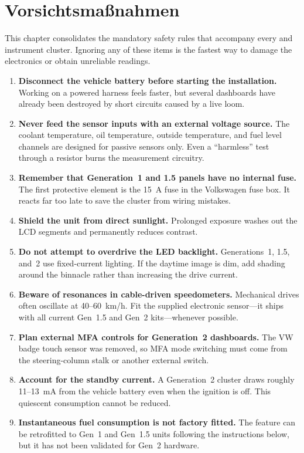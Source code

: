 \chapter{Vorsichtsmaßnahmen}\label{ch:precautions}

This chapter consolidates the mandatory safety rules that accompany every \ReplicaGenOne{} and \ReplicaNextLong{} instrument cluster. Ignoring any of these items is the fastest way to damage the electronics or obtain unreliable readings.

\begin{enumerate}
    \item \textbf{Disconnect the vehicle battery before starting the installation.} Working on a powered harness feels faster, but several dashboards have already been destroyed by short circuits caused by a live loom.
    \item \textbf{Never feed the sensor inputs with an external voltage source.} The coolant temperature, oil temperature, outside temperature, and fuel level channels are designed for passive sensors only. Even a “harmless” test through a resistor burns the measurement circuitry.
    \item \textbf{Remember that Generation~1 and 1.5 panels have no internal fuse.} The first protective element is the 15~A fuse in the Volkswagen fuse box. It reacts far too late to save the cluster from wiring mistakes.
    \item \textbf{Shield the unit from direct sunlight.} Prolonged exposure washes out the LCD segments and permanently reduces contrast.
    \item \textbf{Do not attempt to overdrive the LED backlight.} Generations~1, 1.5, and~2 use fixed-current lighting. If the daytime image is dim, add shading around the binnacle rather than increasing the drive current.
    \item \textbf{Beware of resonances in cable-driven speedometers.} Mechanical drives often oscillate at 40--60~km/h. Fit the supplied electronic sensor---it ships with all current Gen~1.5 and Gen~2 kits---whenever possible.
    \item \textbf{Plan external MFA controls for Generation~2 dashboards.} The VW badge touch sensor was removed, so MFA mode switching must come from the steering-column stalk or another external switch.
    \item \textbf{Account for the standby current.} A Generation~2 cluster draws roughly 11--13~mA from the vehicle battery even when the ignition is off. This quiescent consumption cannot be reduced.
    \item \textbf{Instantaneous fuel consumption is not factory fitted.} The feature can be retrofitted to Gen~1 and Gen~1.5 units following the instructions below, but it has not been validated for Gen~2 hardware.
\end{enumerate}

